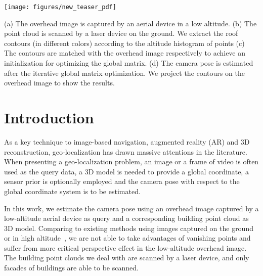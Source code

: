 
\begin{teaserfigure}
	\texttt{[image: figures/new\_teaser\_pdf]}
	\caption{(a) The overhead image is captured by an aerial device in a low altitude. (b) The point cloud is scanned by a laser device on the ground. We extract the roof contours (in different colors) according to the altitude histogram of points (c) The contours are matched with the overhead image respectively to achieve an initialization for optimizing the global matrix. (d) The camera pose is estimated after the iterative global matrix optimization. We project the contours on the overhead image to show the results.}
	\label{fig:teaser}
\end{teaserfigure}


\maketitle



\section{Introduction}
%
As a key technique to image-based navigation, augmented reality (AR) and 3D reconstruction, geo-localization has drawn massive attentions in the literature. When presenting a geo-localization problem, an image or a frame of video is often used as the query data, a 3D model is needed to provide a global coordinate, a sensor prior is optionally employed and the camera pose with respect to the global coordinate system is to be estimated. 

In this work, we estimate the camera pose using an overhead image captured by a low-altitude aerial device as query and a corresponding building point cloud as 3D model. Comparing to existing methods using images captured on the ground~\cite{instant} or in high altitude~\cite{FDCM}, we are not able to take advantages of vanishing points and suffer from more critical perspective effect in the low-altitude overhead image. The building point clouds we deal with are scanned by a laser device, and only facades of buildings are able to be scanned. 

